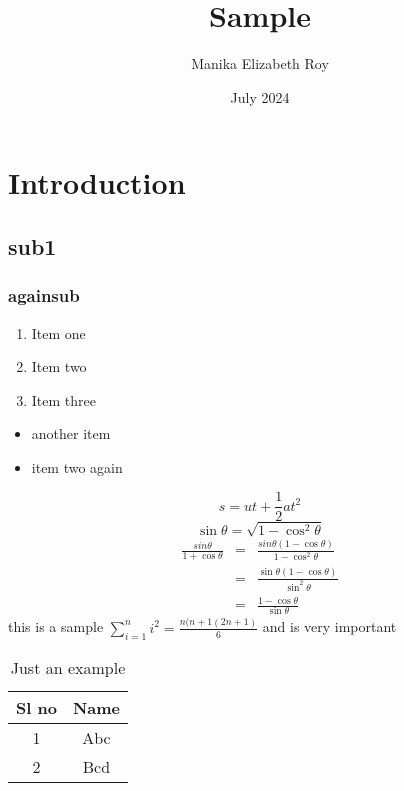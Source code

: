\documentclass{article}
\title{Sample}
\author{Manika Elizabeth Roy}
\date{July 2024}
\begin{document}
\maketitle
\section{Introduction}
\subsection{sub1}
\subsubsection{againsub}

\begin{enumerate}
    \item Item one
    \item Item two
    \item Item three
\end{enumerate}
\begin{itemize}
    \item another item
    \item item two again
\end{itemize}
\begin{equation}
    s=ut+\frac{1}{2}at^2
\end{equation}
\begin{equation*}
    \sin \theta =\sqrt{1-\cos^2\theta}
\end{equation*}
\begin{eqnarray}
    \frac{sin \theta}{1+\cos\theta} & = & \frac{sin \theta(1-\cos\theta)}{1-\cos^2\theta}\\
    & = & \frac{\sin\theta(1-\cos\theta)}{\sin^2\theta}\\
    & = & \frac{1-\cos\theta}{\sin\theta}
\end{eqnarray} 
this is a sample $\sum\limits_{i=1}^{n}i^2=\frac{n(n+1(2n+1)}{6}$ and is very important\\
\begin{table}[]
    \centering
    \begin{tabular}{|c|c|}
         \hline  
    Sl no &  Name\\
        \hline  
    1     &  Abc \\
        \hline  
    2     &  Bcd \\
        \hline   
    \end{tabular}
    \caption{Just an example}
    \label{tab:my_label}
\end{table}
\end{document}
